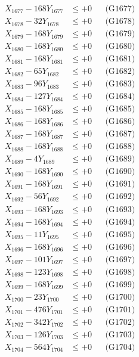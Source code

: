 \documentclass[a4paper,10pt]{article}
\begin{document}
{\begin{align}
X_{1677} - 168Y_{1677} &\leq +0 && \text{(G1677)} \\
X_{1678} - 32Y_{1678} &\leq +0 && \text{(G1678)} \\
X_{1679} - 168Y_{1679} &\leq +0 && \text{(G1679)} \\
X_{1680} - 168Y_{1680} &\leq +0 && \text{(G1680)} \\
\allowbreak
X_{1681} - 168Y_{1681} &\leq +0 && \text{(G1681)} \\
X_{1682} - 65Y_{1682} &\leq +0 && \text{(G1682)} \\
X_{1683} - 96Y_{1683} &\leq +0 && \text{(G1683)} \\
X_{1684} - 127Y_{1684} &\leq +0 && \text{(G1684)} \\
X_{1685} - 168Y_{1685} &\leq +0 && \text{(G1685)} \\
X_{1686} - 168Y_{1686} &\leq +0 && \text{(G1686)} \\
X_{1687} - 168Y_{1687} &\leq +0 && \text{(G1687)} \\
X_{1688} - 168Y_{1688} &\leq +0 && \text{(G1688)} \\
X_{1689} - 4Y_{1689} &\leq +0 && \text{(G1689)} \\
X_{1690} - 168Y_{1690} &\leq +0 && \text{(G1690)} \\
\allowbreak
X_{1691} - 168Y_{1691} &\leq +0 && \text{(G1691)} \\
X_{1692} - 56Y_{1692} &\leq +0 && \text{(G1692)} \\
X_{1693} - 168Y_{1693} &\leq +0 && \text{(G1693)} \\
X_{1694} - 168Y_{1694} &\leq +0 && \text{(G1694)} \\
X_{1695} - 11Y_{1695} &\leq +0 && \text{(G1695)} \\
X_{1696} - 168Y_{1696} &\leq +0 && \text{(G1696)} \\
X_{1697} - 101Y_{1697} &\leq +0 && \text{(G1697)} \\
X_{1698} - 123Y_{1698} &\leq +0 && \text{(G1698)} \\
X_{1699} - 168Y_{1699} &\leq +0 && \text{(G1699)} \\
X_{1700} - 23Y_{1700} &\leq +0 && \text{(G1700)} \\
\allowbreak
X_{1701} - 476Y_{1701} &\leq +0 && \text{(G1701)} \\
X_{1702} - 342Y_{1702} &\leq +0 && \text{(G1702)} \\
X_{1703} - 126Y_{1703} &\leq +0 && \text{(G1703)} \\
X_{1704} - 564Y_{1704} &\leq +0 && \text{(G1704)} \\

\end{align}}
\end{document}
